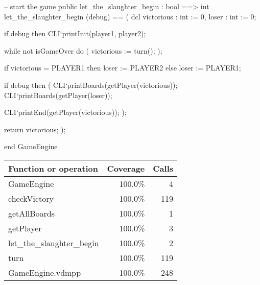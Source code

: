\begin{vdm_al}
  -- start the game
  public let_the_slaughter_begin : bool ==> int
   let_the_slaughter_begin (debug) ==
   (
    dcl victorious : int := 0, loser : int := 0;
    
    if debug then CLI`printInit(player1, player2);
    
    while not isGameOver do
    (
     victorious := turn();
    );
    
    if victorious = PLAYER1 then loser := PLAYER2
    else loser := PLAYER1;
    
    if debug then (
     CLI`printBoards(getPlayer(victorious));
     CLI`printBoards(getPlayer(loser));
     
     CLI`printEnd(getPlayer(victorious));
    );
    
    return victorious;
   );
   
end GameEngine
\end{vdm_al}
\bigskip
\begin{longtable}{|l|r|r|}
\hline
Function or operation & Coverage & Calls \\
\hline
\hline
GameEngine & 100.0\% & 4 \\
\hline
checkVictory & 100.0\% & 119 \\
\hline
getAllBoards & 100.0\% & 1 \\
\hline
getPlayer & 100.0\% & 3 \\
\hline
let\_the\_slaughter\_begin & 100.0\% & 2 \\
\hline
turn & 100.0\% & 119 \\
\hline
\hline
GameEngine.vdmpp & 100.0\% & 248 \\
\hline
\end{longtable}

